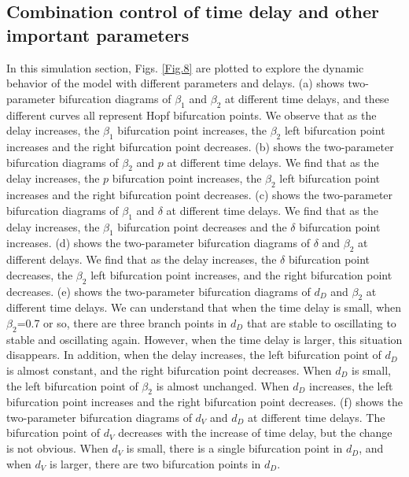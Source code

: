 \documentclass{CMHPhD-SIVD}
\begin{document}
\subsection{Combination control of time delay and other important parameters}

In this simulation section, Figs. \ref{Fig.8} are plotted to explore the dynamic behavior of the model with different parameters and delays.
(a) shows two-parameter bifurcation diagrams of $\beta_1$ and $\beta_2$ at different time delays, and these different curves all represent Hopf bifurcation points. We observe that as the delay increases, the $\beta_1$ bifurcation point increases, the $\beta_2$ left bifurcation point increases and the right bifurcation point decreases. (b) shows the two-parameter bifurcation diagrams of $\beta_2$ and $p$ at different time delays. We find that as the delay increases, the $p$ bifurcation point increases, the $\beta_2$ left bifurcation point increases and the right bifurcation point decreases. (c) shows the two-parameter bifurcation diagrams of $\beta_1$ and $\delta$ at different time delays. We find that as the delay increases, the $\beta_1$ bifurcation point decreases and the $\delta$ bifurcation point increases. (d) shows the two-parameter bifurcation diagrams of $\delta$ and $\beta_2$ at different delays. We find that as the delay increases, the $\delta$ bifurcation point decreases, the $\beta_2$ left bifurcation point increases, and the right bifurcation point decreases. (e) shows the two-parameter bifurcation diagrams of $d_D$ and $\beta_2$ at different time delays. We can understand that when the time delay is small, when $\beta_2$=0.7 or so, there are three branch points in $d_D$ that are stable to oscillating to stable and oscillating again. However, when the time delay is larger, this situation disappears. In addition, when the delay increases, the left bifurcation point of $d_D$ is almost constant, and the right bifurcation point decreases. When $d_D$ is small, the left bifurcation point of $\beta_2$ is almost unchanged. When $d_D$ increases, the left bifurcation point increases and the right bifurcation point decreases. (f) shows the two-parameter bifurcation diagrams of $d_V$ and $d_D$ at different time delays. The bifurcation point of $d_V$ decreases with the increase of time delay, but the change is not obvious. When $d_V$ is small, there is a single bifurcation point in $d_D$, and when $d_V$ is larger, there are two bifurcation points in $d_D$.
\end{document}
